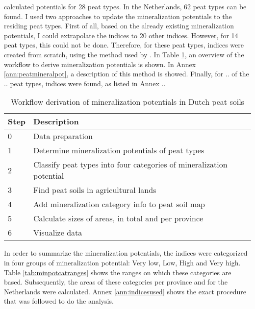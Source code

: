 \documentclass[a4paper,12pt]{scrbook}
\begin{document}
\citet{stouthamer2008toelichting} calculated potentials for 28 peat types. In the Netherlands, 62 peat types can be found. I used two approaches to update the mineralization potentials to the residing peat types. First of all, based on the already existing mineralization potentials, I could extrapolate the indices to 20 other indices. However, for 14 peat types, this could not be done. Therefore, for these peat types, indices were created from scratch, using the method used by \citet{stouthamer2008toelichting}. In Table \ref{tab:workflowminerpot}, an overview of the workflow to derive mineralization potentials is shown. In Annex \ref{ann:peatmineralpot}, a description of this method is showed. Finally, for .. of the .. peat types, indices were found, as listed in Annex .. 

\begin{table}[htbp]
\caption{Workflow derivation of mineralization potentials in Dutch peat soils}
\begin{center}
\begin{tabular}{|p{3cm}|p{10cm}|}
\hline
\multicolumn{1}{|l|}{\textbf{Step}} & \textbf{Description} \\ \hline
0 & Data preparation \\ \hline
1 & Determine mineralization potentials of peat types \\ \hline
2 & Classify peat types into four categories of mineralization potential \\ \hline
3 & Find peat soils in agricultural lands  \\ \hline
4 & Add mineralization category info to peat soil map \\ \hline
5 & Calculate sizes of areas, in total and per province \\ \hline
6 & Visualize data \\ \hline
\end{tabular}
\end{center}
\label{tab:workflowminerpot}
\end{table}


In order to summarize the mineralization potentials, the indices were categorized in four groups of mineralization potential: Very low, Low, High and Very high. Table \ref{tab:minpotcatranges} shows the ranges on which these categories are based. Subsequently, the areas of these categories per province and for the Netherlands were calculated. Annex \ref{ann:indicesused} shows the exact procedure that was followed to do the analysis.
\end{document}
